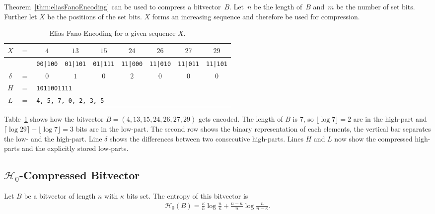 Theorem~\ref{thm:eliasFanoEncoding} can be used to compress a bitvector~$B$. Let~$n$ be the length of~$B$ and~$m$ be the number of set bits. Further let $X$ be the positions of the set bits. $X$ forms an increasing sequence and therefore be used for compression.

\begin{Example}
  \begin{table}[htbp]
    \centering
    \begin{tabular}{ccccccccc}
      \toprule
      $X$ & $=$ & $4$ & $13$ & $15$ & $24$ & $26$ & $27$ & $29$ \\
      \midrule
      & &
      \texttt{00|100} &
      \texttt{01|101} &
      \texttt{01|111} &
      \texttt{11|000} &
      \texttt{11|010} &
      \texttt{11|011} &
      \texttt{11|101} \\

      $\delta$ & $=$ & $0$ & $1$ & $0$ & $2$ & $0$ & $0$ & $0$ \\
      $H$ & $=$ & \multicolumn{7}{l}{\texttt{1011001111}} \\
      $L$ & $=$ & \multicolumn{7}{l}{\texttt{4, 5, 7, 0, 2, 3, 5}} \\
      \bottomrule
    \end{tabular}
    \caption{Elias-Fano-Encoding for a given sequence $X$.}
    \label{tbl:eliasFanoExample}
  \end{table}
  Table~\ref{tbl:eliasFanoExample} shows how the bitvector $B=(4,13,15,24,26,27,29)$ gets encoded. The length of $B$ is $7$, so $\lfloor \log 7 \rfloor = 2$ are in the high-part and $\lceil \log 29 \rceil - \lfloor \log 7 \rfloor = 3$ bits are in the low-part. The second row shows the binary representation of each elements, the vertical bar separates the low- and the high-part. Line $\delta$ shows the differences between two consecutive high-parts. Lines $H$ and $L$ now show the compressed high-parts and the explicitly stored low-parts.
\end{Example}

\subsection{$\mathcal{H}_0$-Compressed Bitvector}

Let $B$ be a bitvector of length $n$ with $\kappa$ bits set. The entropy of this bitvector is
\begin{align}
  \mathcal{H}_0(B) = \frac{\kappa}{n}\log\frac{n}{\kappa} + \frac{n-\kappa}{n}\log\frac{n}{n - \kappa}
  \text{.}
\end{align}

